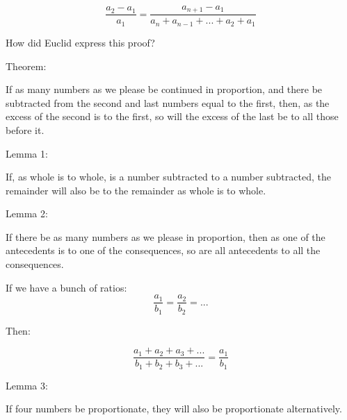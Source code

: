 \documentclass{report}
\begin{document}
\begin{description}
\begin{mdframed}
          \begin{displaymath}
              \frac{a_2 - a_1}{a_1} = \frac{a_{n+1} - a_1}{a_n + a_{n-1} + ... + a_2 + a_1}
          \end{displaymath}
        \end{mdframed}
    \item {\large How did Euclid express this proof?}
        \begin{mdframed}
            Theorem: 
            \begin{mdframed}
               If as many numbers as we please be continued
               in proportion, and there be subtracted from the
               second and last numbers equal to the first,
               then, as the excess of the second is to the
               first, so will the excess of the last be to
               all those before it.
            \end{mdframed}
            Lemma 1:
            \begin{mdframed}
                If, as whole is to whole, is a number subtracted
                to a number subtracted, the remainder will also
                be to the remainder as whole is to whole.
            \end{mdframed}
            Lemma 2:
            \begin{mdframed}
                If there be as many numbers as we please
                in proportion, then as one of the antecedents
                is to one of the consequences, so are all 
                antecedents to all the consequences.

                \begin{mdframed}
                    If we have a bunch of ratios:
                    \begin{displaymath}
                        \frac{a_1}{b_1} = \frac{a_2}{b_2} = ...
                    \end{displaymath}

                    Then:

                    \begin{displaymath}
                        \frac{a_1 + a_2 + a_3 + ...}{ b_1 + b_2 + b_3 + ...}
                        = \frac{a_1}{b_1}
                    \end{displaymath}
                    
                \end{mdframed}

                Lemma 3:
                \begin{mdframed}
                    If four numbers be proportionate, they will
                    also be proportionate alternatively.


\end{mdframed}
\end{mdframed}
\end{mdframed}
\end{description}
\end{document}
